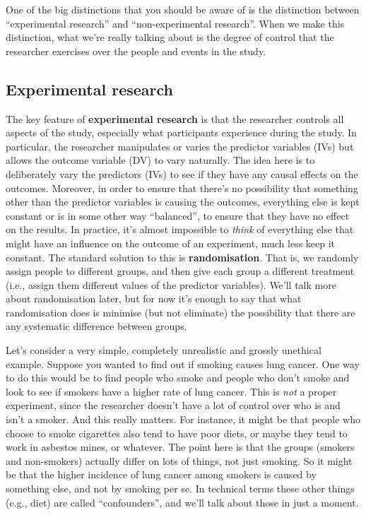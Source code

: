 \documentclass[
  a4paper,
]{book}
\begin{document}
One of the big distinctions that you should be aware of is the
distinction between ``experimental research'' and ``non-experimental
research''. When we make this distinction, what we're really talking
about is the degree of control that the researcher exercises over the
people and events in the study.

\subsection{Experimental research}\label{experimental-research}

The key feature of \textbf{experimental research} is that the researcher
controls all aspects of the study, especially what participants
experience during the study. In particular, the researcher manipulates
or varies the predictor variables (IVs) but allows the outcome variable
(DV) to vary naturally. The idea here is to deliberately vary the
predictors (IVs) to see if they have any causal effects on the outcomes.
Moreover, in order to ensure that there's no possibility that something
other than the predictor variables is causing the outcomes, everything
else is kept constant or is in some other way ``balanced'', to ensure
that they have no effect on the results. In practice, it's almost
impossible to \emph{think} of everything else that might have an
influence on the outcome of an experiment, much less keep it constant.
The standard solution to this is \textbf{randomisation}. That is, we
randomly assign people to different groups, and then give each group a
different treatment (i.e., assign them different values of the predictor
variables). We'll talk more about randomisation later, but for now it's
enough to say that what randomisation does is minimise (but not
eliminate) the possibility that there are any systematic difference
between groups.

Let's consider a very simple, completely unrealistic and grossly
unethical example. Suppose you wanted to find out if smoking causes lung
cancer. One way to do this would be to find people who smoke and people
who don't smoke and look to see if smokers have a higher rate of lung
cancer. This is \emph{not} a proper experiment, since the researcher
doesn't have a lot of control over who is and isn't a smoker. And this
really matters. For instance, it might be that people who choose to
smoke cigarettes also tend to have poor diets, or maybe they tend to
work in asbestos mines, or whatever. The point here is that the groups
(smokers and non-smokers) actually differ on lots of things, not just
smoking. So it might be that the higher incidence of lung cancer among
smokers is caused by something else, and not by smoking per se. In
technical terms these other things (e.g., diet) are called
``confounders'', and we'll talk about those in just a moment.
\end{document}
